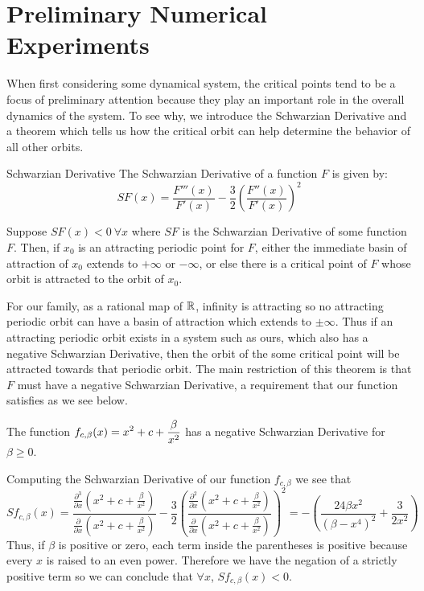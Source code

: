\section{Preliminary Numerical Experiments}\label{res:prelim}

		When first considering some dynamical system, the critical points tend to be a focus of preliminary attention because they play an important role in the overall dynamics of the system. To see why, we introduce the Schwarzian Derivative and a theorem which tells us how the critical orbit can help determine the behavior of all other orbits.

		\begin{mydef}{Schwarzian Derivative\cite{Dev1} }
		The Schwarzian Derivative of a function $F$ is given by:
		\[
			SF (x) = \frac{F''' (x)}{F' (x)} - \frac{3}{2} \left (\frac{F'' (x)}{F' (x)}\right)^2
		\]
		\end{mydef}
		\begin{myth}\label{sch}
			Suppose $SF (x) < 0 \ \forall x$ where $SF$ is the Schwarzian Derivative of some function $F$. Then, if $x_0$ is an attracting periodic point for $F$, either the immediate basin of attraction of $x_0$ extends to $+\infty$ or $-\infty$, or else there is a critical point of $F$ whose orbit is attracted to the orbit of $x_0$\cite{Dev1}.
		\end{myth}

		
		For our family, as a rational map of $\mathbb{R}$, infinity is attracting so no attracting periodic orbit can have a basin of attraction which extends to $\pm\infty$. Thus if an attracting periodic orbit exists in a system such as ours, which also has a negative Schwarzian Derivative, then the orbit of the some critical point will be attracted towards that periodic orbit. The main restriction of this theorem is that $F$ must have a negative Schwarzian Derivative, a requirement that our function satisfies as we see below.

		\begin{myprop}
			The function $\displaystyle f_{c, \beta} (x) = x^2 + c + \frac{\beta}{x^2}$ has a negative Schwarzian Derivative for $\beta \geq 0$.
		\end{myprop}

		\begin{myproof}
			Computing the Schwarzian Derivative of our function $f_{c, \beta}$ we see that 
			\[
				Sf_{c, \beta} (x) = \frac{\frac{\partial^3}{\partial x} \left (x^2 + c + \frac{\beta}{x^2}\right)}{\frac{\partial}{\partial x} \left (x^2 + c + \frac{\beta}{x^2}\right)} - \frac{3}{2} \left (\frac{\frac{\partial^2}{\partial x} \left (x^2 + c + \frac{\beta}{x^2}\right)}{\frac{\partial}{\partial x} \left (x^2 + c + \frac{\beta}{x^2}\right)}\right)^2 = -\left (\frac{24 \beta x^2}{\left (\beta-x^4\right)^2}+\frac{3}{2 x^2}\right)
			\]
			Thus, if $\beta$ is positive or zero, each term inside the parentheses is positive because every $x$ is raised to an even power. Therefore we have the negation of a strictly positive term so we can conclude that $\forall x$, $Sf_{c, \beta} (x) < 0$.
		\end{myproof}

